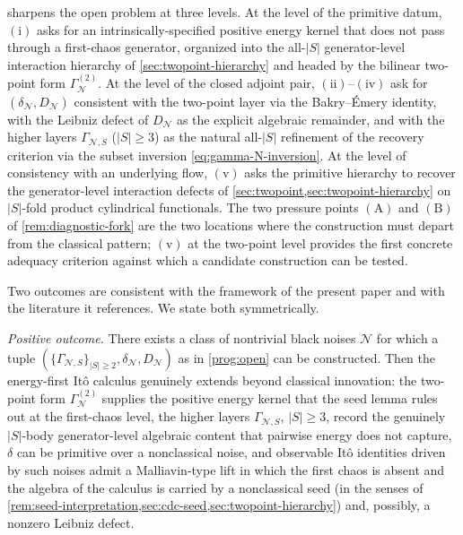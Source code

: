 \documentclass[11pt,reqno]{amsart}
\theoremstyle{plain}
\theoremstyle{definition}
\theoremstyle{remark}
\begin{document}
 sharpens the open problem at three levels. At the
level of the primitive datum, $(\mathrm i)$ asks for an
intrinsically-specified positive energy kernel that does not pass
through a first-chaos generator, organized into the all-$|S|$
generator-level interaction hierarchy of
\cref{sec:twopoint-hierarchy} and headed by the bilinear two-point
form $\Gamma_{\mathcal N}^{(2)}$. At the
level of the closed adjoint pair, $(\mathrm{ii})$--$(\mathrm{iv})$
ask for $(\delta_{\mathcal N},D_{\mathcal N})$ consistent with the
two-point layer via the Bakry--\'Emery identity, with the Leibniz
defect of $D_{\mathcal N}$ as the explicit algebraic remainder, and
with the higher layers $\Gamma_{\mathcal N,S}$ ($|S|\ge 3$) as the
natural all-$|S|$ refinement of the recovery criterion via the
subset inversion \eqref{eq:gamma-N-inversion}. At the level of
consistency with an underlying flow, $(\mathrm v)$ asks the
primitive hierarchy to recover the generator-level interaction
defects of \cref{sec:twopoint,sec:twopoint-hierarchy} on $|S|$-fold
product cylindrical functionals. The two pressure points
$(\mathrm A)$ and $(\mathrm B)$ of \cref{rem:diagnostic-fork} are
the two locations where the construction must depart from the
classical pattern; $(\mathrm v)$ at the two-point level provides
the first concrete adequacy criterion against which a candidate
construction can be tested.

Two outcomes are consistent with the framework of the present paper
and with the literature it references. We state both symmetrically.

\medskip\noindent
\emph{Positive outcome.} There exists a class of nontrivial black
noises $\mathcal N$ for which a tuple
$(\{\Gamma_{\mathcal N,S}\}_{|S|\ge 2},\delta_{\mathcal N},D_{\mathcal N})$
as in \cref{prog:open} can be constructed. Then the energy-first
It\^o calculus genuinely extends beyond classical innovation: the
two-point form $\Gamma_{\mathcal N}^{(2)}$ supplies the positive
energy kernel that the seed lemma rules out at the first-chaos
level, the higher layers $\Gamma_{\mathcal N,S}$, $|S|\ge 3$,
record the genuinely $|S|$-body generator-level algebraic content
that pairwise energy does not capture, $\delta$ can be primitive
over a nonclassical noise, and observable It\^o identities driven by
such noises admit a Malliavin-type lift in which the first chaos is
absent and the algebra of the calculus is carried by a nonclassical
seed (in the senses of
\cref{rem:seed-interpretation,sec:cdc-seed,sec:twopoint-hierarchy})
and, possibly, a nonzero Leibniz defect.
\end{document}
